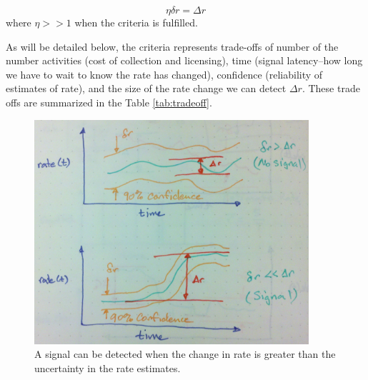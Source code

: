 \documentclass{article}
\begin{document}
\begin{equation}
    \label{eq:criteriaParam}
    \eta \delta r = \Delta r
\end{equation}
where $\eta >> 1$ when the criteria is fulfilled.

As will be detailed below, the criteria represents trade-offs of number of the number activities (cost of collection and licensing), time (signal latency--how long we have to wait to know the rate has changed), confidence (reliability of estimates of rate), and the size of the rate change we can detect $\Delta r$. These trade offs are summarized in the Table \ref{tab:tradeoff}.


%
\begin{figure}[h]
    \centering
    \includegraphics[width=4.0in]{./imgs/signal.jpg}
        \caption{A signal can be detected when the change in rate is greater than the uncertainty in the rate estimates.}
    \label{fig:signal}
\end{figure}
%
%
\end{document}

